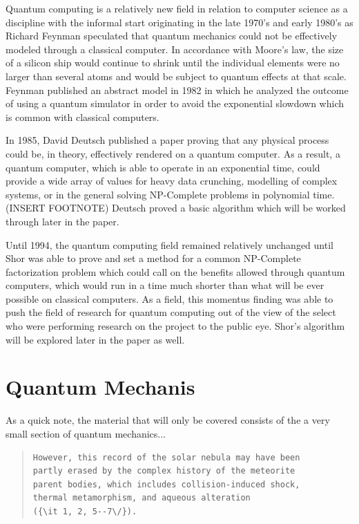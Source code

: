 \documentclass[12pt]{article}
\begin{document}
Quantum computing is a relatively new field in relation to computer science as a discipline with the informal start originating in the late 1970's and early 1980's as Richard Feynman speculated that quantum mechanics could not be effectively modeled through a classical computer. In accordance with Moore's law, the size of a silicon ship would continue to shrink until the individual elements were no larger than several atoms and would be subject to quantum effects at that scale. Feynman published an abstract model in 1982 in which he analyzed the outcome of using a quantum simulator in order to avoid the exponential slowdown which is common with classical computers.\par
In 1985, David Deutsch published a paper proving that any physical process could be, in theory, effectively rendered on a quantum computer. As a result, a quantum computer, which is able to operate in an exponential time, could provide a wide array of values for heavy data crunching, modelling of complex systems, or in the general solving NP-Complete problems in polynomial time. (INSERT FOOTNOTE) Deutsch proved a basic algorithm which will be worked through later in the paper. \par
Until 1994, the quantum computing field remained relatively unchanged until Shor was able to prove and set a method for a common NP-Complete factorization problem which could call on the benefits allowed through quantum computers, which would run in a time much shorter than what will be ever possible on classical computers. As a field, this momentus finding was able to push the field of research for quantum computing out of the view of the select who were performing research on the project to the public eye. Shor's algorithm will be explored later in the paper as well.\par

\section{Quantum Mechanis}

As a quick note, the material that will only be covered consists of the a very small section of quantum mechanics...


\begin{quote}
\begin{verbatim}
However, this record of the solar nebula may have been
partly erased by the complex history of the meteorite
parent bodies, which includes collision-induced shock,
thermal metamorphism, and aqueous alteration
({\it 1, 2, 5--7\/}).
\end{verbatim}
\end{quote}
\end{document}
